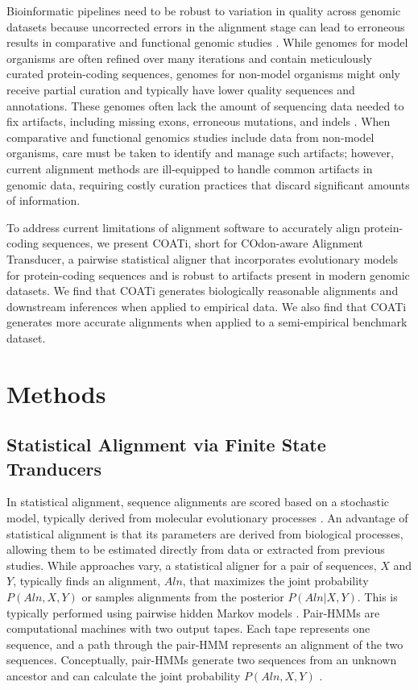 \documentclass[12pt,letterpaper]{article}
\begin{document}
Bioinformatic pipelines need to be robust to variation in quality across genomic datasets because uncorrected errors in the alignment stage can lead to erroneous results in comparative and functional genomic studies \citep{estimates_schneider_2009, effect_fletcher_2010, hubisz2011error}.
While genomes for model organisms are often refined over many iterations and contain meticulously curated protein-coding sequences, 
genomes for non-model organisms might only receive partial curation and typically have lower quality sequences and annotations.
These genomes often lack the amount of sequencing data needed to fix artifacts, including missing exons, erroneous mutations, and indels \citep{jackman2018tigmint}.
%
When comparative and functional genomics studies include data from non-model organisms, care must be taken to identify and manage such artifacts; however,
current alignment methods are ill-equipped to handle common artifacts in genomic data, requiring costly curation practices that discard significant amounts of information.

To address current limitations of alignment software to accurately align protein-coding sequences, we present COATi, short for COdon-aware Alignment Transducer, a pairwise statistical aligner that incorporates evolutionary models for protein-coding sequences and is robust to artifacts present in modern genomic datasets. We find that COATi generates biologically reasonable alignments and downstream inferences when applied to empirical data. We also find that COATi generates more accurate alignments when applied to a semi-empirical benchmark dataset.

\section*{Methods}

\subsection*{Statistical Alignment via Finite State Tranducers}

In statistical alignment, sequence alignments are scored based on a stochastic model, typically derived from molecular evolutionary processes \citep{hein2001algorithm,holmes2001evolutionary,Lunter2005-hk,Holmes2020,demaio2021cumulative}. An advantage of statistical alignment is that its parameters are derived from biological processes, allowing them to be estimated directly from data or extracted from previous studies. While approaches vary, a statistical aligner for a pair of sequences, $X$ and $Y$, typically finds an alignment, $Aln$, that maximizes the joint probability $P(Aln, X, Y)$ or samples alignments from the posterior $P(Aln | X, Y)$. This is typically performed using pairwise hidden Markov models \citep[pair-HMMs;][]{holmes2001evolutionary,redelings2007incorporating,problems_cartwright_2009}. Pair-HMMs are computational machines with two output tapes. Each tape represents one sequence, and a path through the pair-HMM represents an alignment of the two sequences. Conceptually, pair-HMMs generate two sequences from an unknown ancestor and can calculate the joint probability $P(Aln, X, Y)$ \citep{yoon_2009_hmm}.
\end{document}
